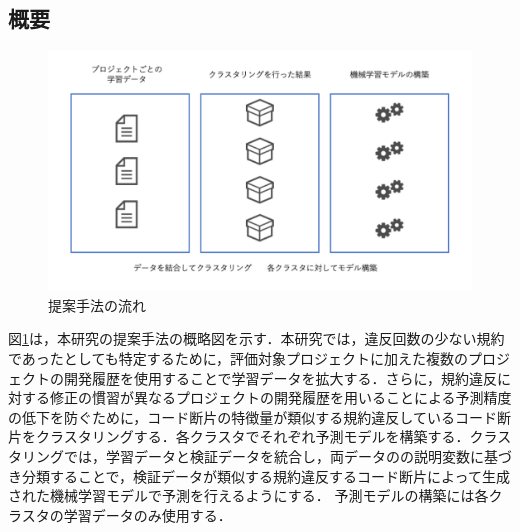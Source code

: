 \documentclass[T,J]{fose} %
\newcommand{\todo}[1]{\colorbox{yellow}{{\bf TODO}:}{\color{red} {\textbf{[#1]}}}}
\begin{document}
\subsection{概要}
\begin{figure}[t]
	\centering
	\includegraphics[width=1.0\linewidth]{Kameoka_fig/teiannsyuhou.pdf}
	\caption{提案手法の流れ}
	\label{fig:Teiannsyuhou}
\end{figure}

図\ref{fig:Teiannsyuhou}は，本研究の提案手法の概略図を示す．本研究では，違反回数の少ない規約であったとしても特定するために，評価対象プロジェクトに加えた複数のプロジェクトの開発履歴を使用することで学習データを拡大する．さらに，規約違反に対する修正の慣習が異なるプロジェクトの開発履歴を用いることによる予測精度の低下を防ぐために，コード断片の特徴量が類似する規約違反しているコード断片をクラスタリングする．各クラスタでそれぞれ予測モデルを構築する．クラスタリングでは，学習データと検証データを統合し，両データのの説明変数に基づき分類することで，検証データが類似する規約違反するコード断片によって生成された機械学習モデルで予測を行えるようにする．
予測モデルの構築には各クラスタの学習データのみ使用する．

\end{document}
